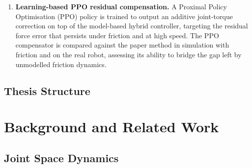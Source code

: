 \documentclass[
	german,%
	accentcolor=9c,%
	ruledheaders=section,%
	class=report,%
	thesis={type=bachelor},%
	fontsize=11pt,%
	parskip=half-,%
	custommargins=true,%
	marginpar=false,%
]{tudapub}
\begin{document}
\begin{enumerate}
    \item \textbf{Learning-based PPO residual compensation.}
          A Proximal Policy Optimisation (PPO) policy is trained to output an
          additive joint-torque correction on top of the model-based hybrid
          controller, targeting the residual force error that persists under
          friction and at high speed.
          The PPO compensator is compared against the paper method in
          simulation with friction and on the real robot, assessing its
          ability to bridge the gap left by unmodelled friction dynamics.

\end{enumerate}


\section{Thesis Structure}



\chapter{Background and Related Work}

\section{Joint Space Dynamics}
\label{sec:joint_dynamics}
\end{document}
